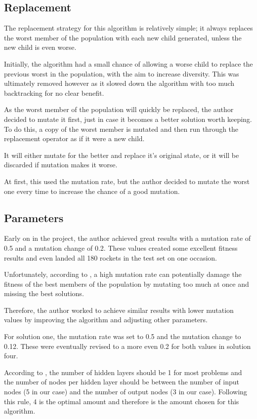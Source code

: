 \documentclass[sigconf]{acmart}
\begin{document}
\subsection{Replacement}
The replacement strategy for this algorithm is relatively simple; it always replaces the worst member of the population with each new child generated, unless the new child is even worse.

Initially, the algorithm had a small chance of allowing a worse child to replace the previous worst in the population, with the aim to increase diversity. This was ultimately removed however as it slowed down the algorithm with too much backtracking for no clear benefit.

As the worst member of the population will quickly be replaced, the author decided to mutate it first, just in case it becomes a better solution worth keeping. To do this, a copy of the worst member is mutated and then run through the replacement operator as if it were a new child. 

It will either mutate for the better and replace it's original state, or it will be discarded if mutation makes it worse.

At first, this used the mutation rate, but the author decided to mutate the worst one every time to increase the chance of a good mutation.

\subsection{Parameters}
Early on in the project, the author achieved great results with a mutation rate of 0.5 and a mutation change of 0.2. These values created some excellent fitness results and even landed all 180 rockets in the test set on one occasion. 

Unfortunately, according to \cite{mutateRate}, a high mutation rate can potentially damage the fitness of the best members of the population by mutating too much at once and missing the best solutions.

Therefore, the author worked to achieve similar results with lower mutation values by improving the algorithm and adjusting other parameters.

For solution one, the mutation rate was set to 0.5 and the mutation change to 0.12. These were eventually revised to a more even 0.2 for both values in solution four.

According to \cite{hiddenLayers}, the number of hidden layers should be 1 for most problems and the number of nodes per hidden layer should be between the number of input nodes (5 in our case) and the number of output nodes (3 in our case). Following this rule, 4 is the optimal amount and therefore is the amount chosen for this algorithm.
\end{document}
